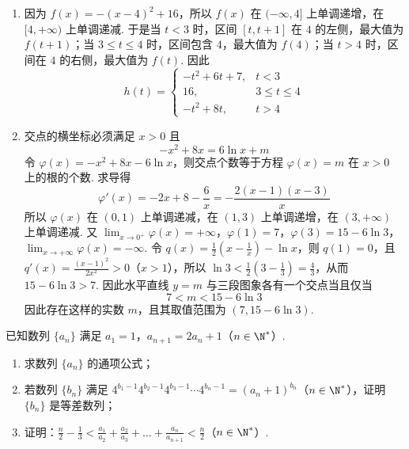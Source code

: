 \begin{solution}
\begin{enumerate}
\item 因为 \(f(x)=-(x-4)^{2}+16\)，所以 \(f(x)\) 在 \((-\infty,4]\) 上单调递增，在 \([4,+\infty)\) 上单调递减. 于是当 \(t<3\) 时，区间 \([t,t+1]\) 在 \(4\) 的左侧，最大值为 \(f(t+1)\)；当 \(3\leqslant t\leqslant4\) 时，区间包含 \(4\)，最大值为 \(f(4)\)；当 \(t>4\) 时，区间在 \(4\) 的右侧，最大值为 \(f(t)\). 因此
\[
h(t)=
\begin{cases}
-t^{2}+6t+7, & t<3 \\
16, & 3\leqslant t\leqslant4 \\
-t^{2}+8t, & t>4
\end{cases}
\]
\item 交点的横坐标必须满足 \(x>0\) 且
\[
-x^{2}+8x=6\ln x+m
\]
令 \(\varphi(x)=-x^{2}+8x-6\ln x\)，则交点个数等于方程 \(\varphi(x)=m\) 在 \(x>0\) 上的根的个数. 求导得
\[
\varphi'(x)=-2x+8-\frac{6}{x}=-\frac{2(x-1)(x-3)}{x}
\]
所以 \(\varphi(x)\) 在 \((0,1)\) 上单调递减，在 \((1,3)\) 上单调递增，在 \((3,+\infty)\) 上单调递减. 又 \(\lim_{x\to0^{+}}\varphi(x)=+\infty\)，\(\varphi(1)=7\)，\(\varphi(3)=15-6\ln3\)，\(\lim_{x\to+\infty}\varphi(x)=-\infty\).
令 \(q(x)=\frac{1}{2}\left(x-\frac{1}{x}\right)-\ln x\)，则 \(q(1)=0\)，且 \(q'(x)=\frac{(x-1)^2}{2x^2}>0\)（\(x>1\)），所以 \(\ln3<\frac{1}{2}\left(3-\frac{1}{3}\right)=\frac{4}{3}\)，从而 \(15-6\ln3>7\).
因此水平直线 \(y=m\) 与三段图象各有一个交点当且仅当
\[
7<m<15-6\ln3
\]
因此存在这样的实数 \(m\)，且其取值范围为 \(\left(7,15-6\ln3\right)\).
\end{enumerate}
\end{solution}

\begin{problem}
已知数列 \(\{a_{n}\}\) 满足 \(a_1 = 1\)，\(a_{n+1} = 2a_n + 1\)（\(n \in \N^*\)）.

\begin{enumerate}
\item 求数列 \(\{a_{n}\}\) 的通项公式；
\item 若数列 \(\{b_{n}\}\) 满足 \(4^{b_1 - 1}4^{b_2 - 1}4^{b_3 - 1}\cdots 4^{b_n - 1} = (a_n + 1)^{b_n}\)（\(n \in \N^*\)），证明 \(\{b_n\}\) 是等差数列；
\item 证明：\(\frac{n}{2} - \frac{1}{3} < \frac{a_1}{a_2} + \frac{a_2}{a_3} + \ldots + \frac{a_n}{a_{n+1}} < \frac{n}{2}\)（\(n \in \N^*\)）.
\end{enumerate}
\end{problem}

